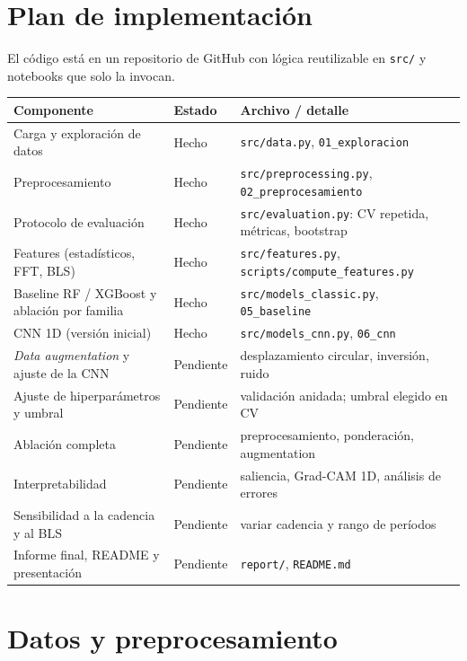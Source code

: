 \documentclass[11pt,a4paper]{article}
\begin{document}
\section{Plan de implementación}

El código está en un repositorio de GitHub con lógica reutilizable en
\texttt{src/} y notebooks que solo la invocan.

\begin{center}
\small
\begin{tabular}{@{}p{4.6cm}p{2.0cm}p{9.5cm}@{}}
\toprule
\textbf{Componente} & \textbf{Estado} & \textbf{Archivo / detalle}\\
\midrule
Carga y exploración de datos & Hecho & \texttt{src/data.py}, \texttt{01\_exploracion}\\
Preprocesamiento & Hecho & \texttt{src/preprocessing.py}, \texttt{02\_preprocesamiento}\\
Protocolo de evaluación & Hecho & \texttt{src/evaluation.py}: CV repetida, métricas, bootstrap\\
Features (estadísticos, FFT, BLS) & Hecho & \texttt{src/features.py}, \texttt{scripts/compute\_features.py}\\
Baseline RF / XGBoost y ablación por familia & Hecho & \texttt{src/models\_classic.py}, \texttt{05\_baseline}\\
CNN 1D (versión inicial) & Hecho & \texttt{src/models\_cnn.py}, \texttt{06\_cnn}\\
\emph{Data augmentation} y ajuste de la CNN & Pendiente & desplazamiento circular, inversión, ruido\\
Ajuste de hiperparámetros y umbral & Pendiente & validación anidada; umbral elegido en CV\\
Ablación completa & Pendiente & preprocesamiento, ponderación, augmentation\\
Interpretabilidad & Pendiente & saliencia, Grad-CAM 1D, análisis de errores\\
Sensibilidad a la cadencia y al BLS & Pendiente & variar cadencia y rango de períodos\\
Informe final, README y presentación & Pendiente & \texttt{report/}, \texttt{README.md}\\
\bottomrule
\end{tabular}
\end{center}

\section{Datos y preprocesamiento}\label{sec:datos}
\end{document}
